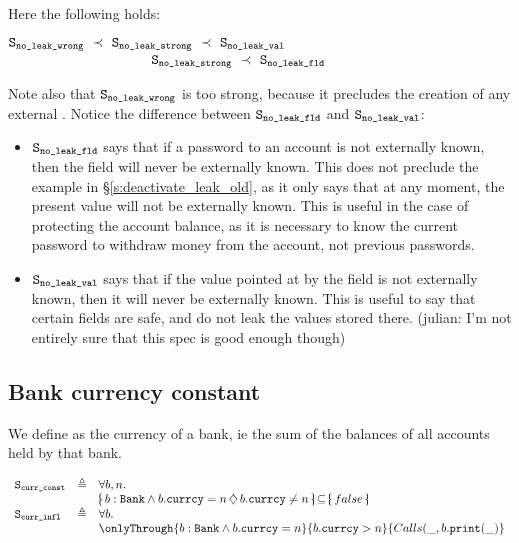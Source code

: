 \vspace{.1in}
\noindent
Here the following holds:

$\Spec{no\_leak\_wrong}  \ \prec\ \Spec{no\_leak\_strong}  \ \prec \ \Spec{no\_leak\_val} $\\
$\ \ \strut \ \ \ \ \ \ \ \hspace{1in} {\texttt{S}}_{{\texttt{no\_leak\_strong}}}  \ \prec \ {\texttt{S}}_{{\texttt{no\_leak\_fld}}} $

\noindent
Note also that
 ${\texttt{S}}_{{\texttt{no\_leak\_wrong}}}$ is too strong, because it precludes the creation of any external .
 Notice the difference between ${\texttt{S}}_{{\texttt{no\_leak\_fld}}}$ and ${\texttt{S}}_{{\texttt{no\_leak\_val}}}$:
 \begin{itemize}
 \item
 ${\texttt{S}}_{{\texttt{no\_leak\_fld}}}$ says that if a password to an account is not externally known, then 
the field will never be externally known. This does not preclude the example in \S \ref{s:deactivate_leak_old}, as it only says that at any moment, the present value will not be externally known. This is useful in the case of protecting the account balance, as it is necessary to know the current password to withdraw money from the account, not previous passwords.
\item
${\texttt{S}}_{{\texttt{no\_leak\_val}}}$ says that if the value pointed at by the field   is not externally known, then it will never be externally known. This is useful to say that certain fields are safe, and do not leak the values stored there. (julian: I'm not entirely sure that this spec is good enough though)
\end{itemize}

 \subsection{Bank currency constant}
 \label{bank:curr:const}
 
 We define as  the currency of a bank, ie the sum of the balances of all accounts held by that bank.
 
 $\begin{array}{lll}
 \Spec{curr\_const} & \triangleq &  \forall b,n.\\
 & &   \onlyIf{b:\prg{Bank}\wedge b.\prg{currcy}=n}{b.\prg{currcy}\neq n} {false}\   
 \\
  \Spec{curr\_infl} & \triangleq &  \forall b.\\
 & &   \onlyThrough{b:\prg{Bank}\wedge b.\prg{currcy}=n}{b.\prg{currcy}> n} {\calls{\_}{b}{\prg{print}}{\_} }   
\end{array}
$
 
